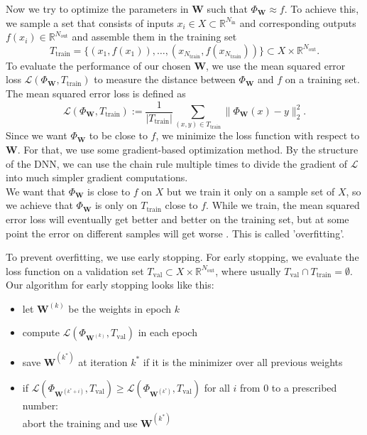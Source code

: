 Now we try to optimize the parameters in $\mathbf{W}$ such that $\Phi_\mathbf{W}\approx f$. To achieve this, we sample a set that consists of inputs $x_i\in X\subset\mathbb{R}^{N_{\mathrm{in}}}$ and corresponding outputs $f(x_i)\in\mathbb{R}^{N_{\mathrm{out}}}$ and assemble them in the training set
\begin{equation}
T_\mathrm{train}=\{(x_1,f(x_1)),\dotsc,(x_{N_\mathrm{train}},f(x_{N_\mathrm{train}}))\}\subset X\times\mathbb{R}^{N_\mathrm{out}}.
\end{equation}
To evaluate the performance of our chosen $\mathbf{W}$, we use the mean squared error loss $\mathscr{L}(\Phi_\mathbf{W},T_\mathrm{train})$ to measure the distance between $\Phi_\mathbf{W}$ and $f$ on a training set. The mean squared error loss is defined as
\begin{displaymath}
\mathscr{L}(\Phi_\mathbf{W},T_\mathrm{train}):=\frac{1}{|T_\mathrm{train}|}\sum_{(x,y)\in T_\mathrm{train}}\| \Phi_\mathbf{W}(x)-y\|_2^2.
\end{displaymath}
Since we want $\Phi_\mathbf{W}$ to be close to $f$, we minimize the loss function with respect to $\mathbf{W}$. For that, we use some gradient-based optimization method. By the structure of the DNN, we can use the chain rule multiple times to divide the gradient of $\mathscr{L}$ into much simpler gradient computations.\\

We want that $\Phi_\mathbf{W}$ is close to $f$ on $X$ but we train it only on a sample set of $X$, so we achieve that $\Phi_\mathbf{W}$ is only on $T_\mathrm{train}$ close to $f$. While we train, the mean squared error loss will eventually get better and better on the training set, but at some point the error on different samples will get worse \cite{Prechelt2012}. This is called 'overfitting'.

To prevent overfitting, we use early stopping. For early stopping, we evaluate the loss function on a validation set $T_\mathrm{val}\subset X\times\mathbb{R}^{N_\mathrm{out}}$, where usually $T_\mathrm{val}\cap T_\mathrm{train}=\emptyset$. Our algorithm for early stopping looks like this:

\begin{itemize}
\item let $\mathbf{W}^{(k)}$ be the weights in epoch $k$%
\item compute $\mathscr{L}(\Phi_{\mathbf{W}^{(k)}},T_\mathrm{val})$ in each epoch
\item save $\mathbf{W}^{(k^*)}$ at iteration $k^*$ if it is the minimizer over all previous weights
\item if $\mathscr{L}(\Phi_{\mathbf{W}^{(k^*+i)}},T_\mathrm{val})\geq\mathscr{L}(\Phi_{\mathbf{W}^{(k^*)}},T_\mathrm{val})$ for all $i$ from $0$ to a prescribed number:\\
abort the training and use $\mathbf{W}^{(k^*)}$
\end{itemize}

